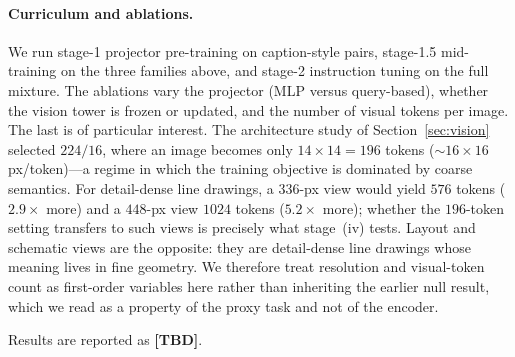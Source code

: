 \paragraph{Curriculum and ablations.}
We run stage-1 projector pre-training on caption-style pairs, stage-1.5 mid-training on the three families above, and stage-2 instruction tuning on the full mixture.
The ablations vary the projector (MLP versus query-based), whether the vision tower is frozen or updated, and the number of visual tokens per image.
The last is of particular interest.
The architecture study of Section~\ref{sec:vision} selected $224/16$, where an image becomes only $14{\times}14 = 196$ tokens (${\sim}16{\times}16$\,px/token)---a regime in which the training objective is dominated by coarse semantics. For detail-dense line drawings, a $336$-px view would yield $576$ tokens ($2.9{\times}$ more) and a $448$-px view $1024$ tokens ($5.2{\times}$ more); whether the $196$-token setting transfers to such views is precisely what stage~(iv) tests.
Layout and schematic views are the opposite: they are detail-dense line drawings whose meaning lives in fine geometry.
We therefore treat resolution and visual-token count as first-order variables here rather than inheriting the earlier null result, which we read as a property of the proxy task and not of the encoder.

Results are reported as \textbf{[TBD]}.
